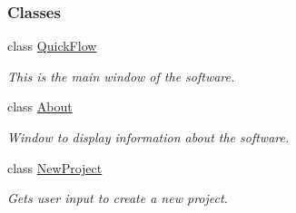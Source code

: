 \subsubsection*{Classes}
\begin{DoxyCompactItemize}
\item 
class \hyperlink{class_quick_flow}{Quick\+Flow}
\begin{DoxyCompactList}\small\item\em This is the main window of the software. \end{DoxyCompactList}\item 
class \hyperlink{class_about}{About}
\begin{DoxyCompactList}\small\item\em Window to display information about the software. \end{DoxyCompactList}\item 
class \hyperlink{class_new_project}{New\+Project}
\begin{DoxyCompactList}\small\item\em Gets user input to create a new project. \end{DoxyCompactList}\end{DoxyCompactItemize}

